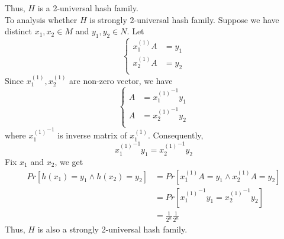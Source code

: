 \documentclass{article}
\begin{document}
	Thus, $H$ is a 2-universal hash family.\\
	To analysis whether $H$ is strongly 2-universal hash family.
	Suppose we have distinct $x_1,x_2 \in M$ and $y_1,y_2 \in N$.
	Let
	$$
	\begin{cases}
	x_1^{(1)}A&=y_1 \\
	x_2^{(1)}A&=y_2 \\
	\end{cases}
	$$
	Since $x_1^{(1)}, x_2^{(1)}$ are non-zero vector, we have
	$$
	\begin{cases}
	A&={x_1^{(1)}}^{-1}y_1 \\
	A&={x_2^{(1)}}^{-1}y_2 \\
	\end{cases}
	$$
	where ${x_1^{(1)}}^{-1}$ is inverse matrix of $x_1^{(1)}$.
	Consequently,
	$$
	{x_1^{(1)}}^{-1}y_1={x_2^{(1)}}^{-1}y_2
	$$
	Fix $x_1$ and $x_2$, we get
	$$
	\begin{aligned}
	Pr[h(x_1)=y_1 \land h(x_2)=y_2] &= Pr[x_1^{(1)}A=y_1 \land x_2^{(1)}A=y_2]\\
	&=Pr[{x_1^{(1)}}^{-1}y_1={x_2^{(1)}}^{-1}y_2]\\
	&=\frac{1}{2^n}\frac{1}{2^n}
	\end{aligned}
	$$
	Thus, $H$ is also a strongly 2-universal hash family.
\end{document}
